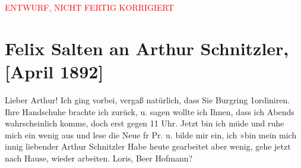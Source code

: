 
\begin{center}
            \textcolor{red}{ENTWURF, NICHT FERTIG KORRIGIERT}
                      \end{center}
            
         
         \renewcommand{\erwaehntePersonen}{Personen: Richard Beer-Hofmann, Hugo von Hofmannsthal}
         \renewcommand{\erwaehnteOrte}{Orte: Burgring, Ordination Dr. Arthur Schnitzler, Wien}
         \renewcommand{\erwaehnteWerke}{Werke: Neue Freie Presse}
               \section[Felix Salten an Arthur Schnitzler, {[}April 1892{]}]{ Felix Salten an Arthur Schnitzler, {[}April 1892{]}}\nopagebreak{}\rehead{ }\begin{ledgroupsized}[t]{13cm}\normalsize\beginnumbering \toendnotes[C]{\smallbreak\pagebreak[2]} 
\pstart
           \noindent{}{\pb}Lieber Arthur! Ich ging vorbei, vergaß natürlich, dass Sie Burgring 1ordiniren. Ihre Handschuhe brachte ich zurück, u.
               sagen wollte ich Ihnen, dass ich Abends wahrscheinlich komme, doch erst gegen 11 Uhr.
               Jetzt bin ich müde und ruhe mich {\pb}ein wenig aus und
               lese die Neue fr Pr. u. bilde mir ein,
               ich »bin mein mich innig liebender
            \pend
           \pstart
           \centering{}Arthur Schnitzler\pend
           \pstart
           \noindent{}Habe heute gearbeitet aber wenig, gehe jetzt
            nach Hause, wieder arbeiten.\pend
           \pstart
           Loris, Beer Hofmann?\pend
           
         
         \endnumbering{}\end{ledgroupsized}\begin{anhang}\end{anhang}\newcommand{\dateiname}{L03184}\newcommand{\titel}{Felix Salten an Arthur Schnitzler, [April 1892]}\newcommand{\editorInnen}{Martin Anton Müller und Laura Untner}
      